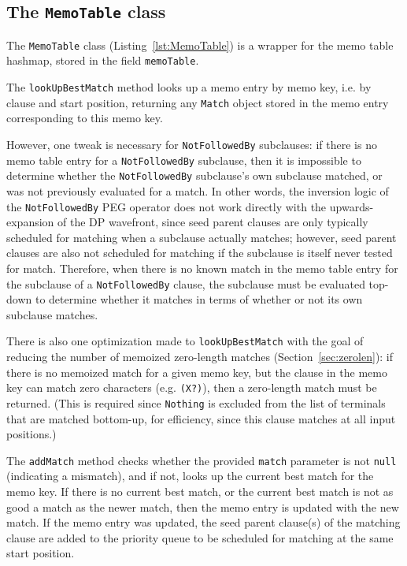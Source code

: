 \documentclass[manuscript,screen]{acmart}
\begin{document}
\subsection{\label{sec:MemoTable}The \texttt{MemoTable} class}

The \texttt{MemoTable} class (Listing~\ref{lst:MemoTable}) is a wrapper for the memo table hashmap, stored in the field \texttt{memoTable}.

The \texttt{lookUpBestMatch} method looks up a memo entry by memo key, i.e. by clause and start position, returning any \texttt{Match} object stored in the memo entry corresponding to this memo key.

However, one tweak is necessary for \texttt{NotFollowedBy} subclauses: if there is no memo table entry for a \texttt{NotFollowedBy} subclause, then it is impossible to determine whether the \texttt{NotFollowedBy} subclause's own subclause matched, or was not previously evaluated for a match. In other words, the inversion logic of the \texttt{NotFollowedBy} PEG operator does not work directly with the upwards-expansion of the DP wavefront, since seed parent clauses are only typically scheduled for matching when a subclause actually matches; however, seed parent clauses are also not scheduled for matching if the subclause is itself never tested for match. Therefore, when there is no known match in the memo table entry for the subclause of a \texttt{NotFollowedBy} clause, the subclause must be evaluated top-down to determine whether it matches in terms of whether or not its own subclause matches. 

There is also one optimization made to \texttt{lookUpBestMatch} with the goal of reducing the number of memoized zero-length matches (Section~\ref{sec:zerolen}): if there is no memoized match for a given memo key, but the clause in the memo key can match zero characters (e.g. \texttt{(X?)}), then a zero-length match must be returned. (This is required since \texttt{Nothing} is excluded from the list of terminals that are matched bottom-up, for efficiency, since this clause matches at all input positions.)

The \texttt{addMatch} method checks whether the provided \texttt{match} parameter is not \texttt{null} (indicating a mismatch), and if not, looks up the current best match for the memo key. If there is no current best match, or the current best match is not as good a match as the newer match, then the memo entry is updated with the new match. If the memo entry was updated, the seed parent clause(s) of the matching clause are added to the priority queue to be scheduled for matching at the same start position.
\end{document}
